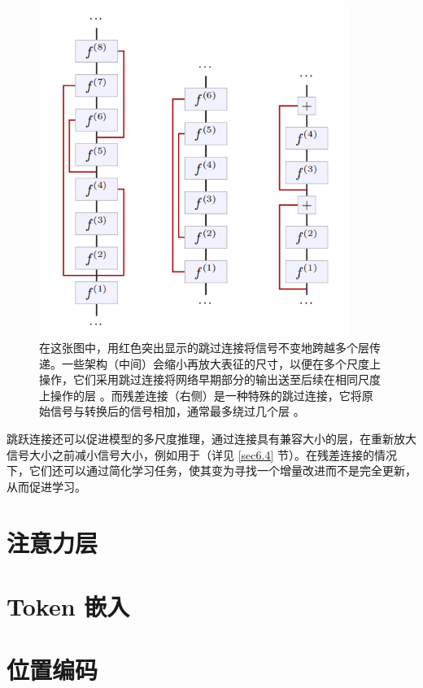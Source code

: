 \begin{figure}
    \centering
    \includegraphics[width=0.9\textwidth]{fig/fig4.10.png}
    \caption[跳跃连接]{在这张图中，用红色突出显示的跳过连接将信号不变地跨越多个层传递。一些架构（中间）会缩小再放大表征的尺寸，以便在多个尺度上操作，它们采用跳过连接将网络早期部分的输出送至后续在相同尺度上操作的层 \citep{arxiv-1411.4038, arxiv-1505.04597}。而残差连接（右侧）是一种特殊的跳过连接，它将原始信号与转换后的信号相加，通常最多绕过几个层 \citep{arxiv-1512.03385}。}
    \label{fig4.10}
\end{figure}

跳跃连接还可以促进模型的多尺度推理，通过连接具有兼容大小的层，在重新放大信号大小之前减小信号大小，例如用于（详见 \ref{sec6.4} 节）。在残差连接的情况下，它们还可以通过简化学习任务，使其变为寻找一个增量改进而不是完全更新，从而促进学习。

\section{注意力层}\label{sec4.8}

\section{Token 嵌入}\label{sec4.9}

\section{位置编码}\label{sec4.10}